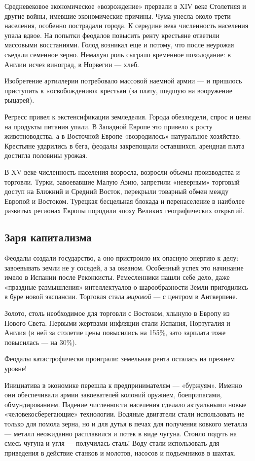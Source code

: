 Средневековое экономическое «возрождение» прервали в \foreignlanguage{english}{XIV} веке Столетняя и другие войны, имевшие экономические причины. Чума унесла около трети населения, особенно пострадали города. К середине века численность населения упала вдвое. На попытки феодалов повысить ренту крестьяне ответили массовыми восстаниями. Голод возникал еще и потому, что после неурожая съедали семенное зерно. Немалую роль сыграло временное похолодание: в Англии исчез виноград, в Норвегии — хлеб.

Изобретение артиллерии потребовало массовой наемной армии — и пришлось приступить к «освобождению» крестьян (за плату, шедшую на вооружение рыцарей).

Регресс привел к экстенсификации земледелия. Города обезлюдели, спрос и цены на продукты питания упали. В Западной Европе это привело к росту животноводства, а в Восточной Европе «возродилось» натуральное хозяйство. Крестьяне ударились в бега, феодалы закрепощали оставшихся, арендная плата достигла половины урожая.

В \foreignlanguage{english}{XV} веке численность населения возросла, возросли объемы производства и торговли. Турки,
завоевавшие Малую Азию, запретили «неверным» торговый доступ на Ближний и Средний Восток, перекрыли товарный обмен
между Европой и Востоком. Турецкая бесцельная блокада и перенаселение в наиболее развитых регионах Европы породили
эпоху Великих географических открытий.

\subsection[Заря капитализма]{Заря капитализма}

Феодалы создали государство, а оно пристроило их опасную энергию к делу: завоевывать земли не у соседей, а за океаном.
Особенный успех это начинание имело в Испании после Реконкисты. Ремесленники нашли себе дело, даже «праздные
размышления» интеллектуалов о шарообразности Земли пригодились в буре новой экспансии. Торговля стала \textit{мировой}
— с центром в Антверпене.


Золото, столь необходимое для торговли с Востоком, хлынуло в Европу из Нового Света. Первыми жертвами инфляции стали
Испания, Португалия и Англия (в ней за столетие цены повысились на 155\%, зато зарплата тоже повысилась — на 30\%).


Феодалы катастрофически проиграли: земельная рента осталась на прежнем уровне!


Инициатива в экономике перешла к предпринимателям — «буржуям». Именно они обеспечивали армии завоевателей колоний
оружием, боеприпасами, обмундированием. Падение численности населения сделало актуальными новые «человекосберегающие»
технологии. Водяные двигатели стали использовать не только для помола зерна, но и для дутья в печах для получения
ковкого металла — металл неожиданно расплавился и потек в виде чугуна. Стоило подуть на смесь чугуна и угля —
получилась сталь! Воду стали использовать для приведения в действие станков и молотов, насосов и подъемников в шахтах.


